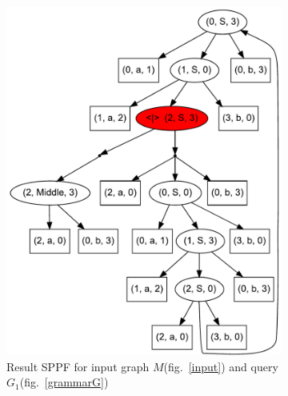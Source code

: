 \begin{figure}[ht]
    \begin{center}
    \centering
    \begin{subfigure}[b]{0.3\textwidth}
         \includegraphics[width=\textwidth]{dot/AnBn.pdf}
        \caption{Result SPPF for input graph $M$(fig.~\ref{input}) and query $G_1$(fig.~\ref{grammarG})}
        \label{SPPF}        
    \end{subfigure}
    ~
    \begin{subfigure}[b]{0.3\textwidth}

\end{subfigure}
\end{center}
\end{figure}
